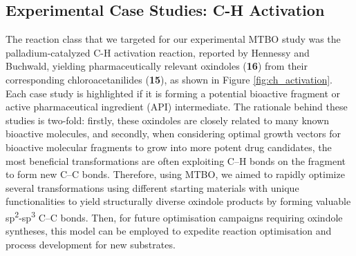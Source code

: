\subsection{Experimental Case Studies: C-H Activation}

The reaction class that we targeted for our experimental MTBO study was the palladium-catalyzed C-H activation reaction, reported by Hennessy and Buchwald, yielding pharmaceutically relevant oxindoles (\textbf{16}) from their corresponding chloroacetanilides (\textbf{15}), as shown in Figure \ref{fig:ch_activation}. Each case study is highlighted if it is forming a potential bioactive fragment or active pharmaceutical ingredient (API) intermediate. The rationale behind these studies is two-fold: firstly, these oxindoles are closely related to many known bioactive molecules, and secondly, when considering optimal growth vectors for bioactive molecular fragments to grow into more potent drug candidates, the most beneficial transformations are often exploiting C--H bonds on the fragment to form new C--C bonds. Therefore, using MTBO, we aimed to rapidly optimize several transformations using different starting materials with unique functionalities to yield structurally diverse oxindole products by forming valuable sp\textsuperscript{2}-sp\textsuperscript{3} C--C bonds. Then, for future optimisation campaigns requiring oxindole syntheses, this model can be employed to expedite reaction optimisation and process development for new substrates.

